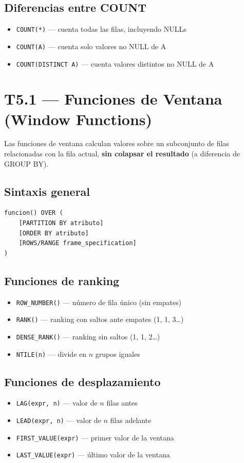 \documentclass[12pt, a4paper]{article}
\begin{document}
\subsection{Diferencias entre COUNT}
\begin{itemize}
  \item \texttt{COUNT(*)} — cuenta todas las filas, incluyendo NULLs
  \item \texttt{COUNT(A)} — cuenta solo valores no NULL de A
  \item \texttt{COUNT(DISTINCT A)} — cuenta valores distintos no NULL de A
\end{itemize}

\section{T5.1 — Funciones de Ventana (Window Functions)}

Las funciones de ventana calculan valores sobre un subconjunto de filas relacionadas con la fila actual, \textbf{sin colapsar el resultado} (a diferencia de GROUP BY).

\subsection{Sintaxis general}
\begin{lstlisting}
funcion() OVER (
    [PARTITION BY atributo]
    [ORDER BY atributo]
    [ROWS/RANGE frame_specification]
)
\end{lstlisting}

\subsection{Funciones de ranking}
\begin{itemize}
  \item \texttt{ROW\_NUMBER()} — número de fila único (sin empates)
  \item \texttt{RANK()} — ranking con saltos ante empates (1, 1, 3\ldots)
  \item \texttt{DENSE\_RANK()} — ranking sin saltos (1, 1, 2\ldots)
  \item \texttt{NTILE(n)} — divide en $n$ grupos iguales
\end{itemize}

\subsection{Funciones de desplazamiento}
\begin{itemize}
  \item \texttt{LAG(expr, n)} — valor de $n$ filas antes
  \item \texttt{LEAD(expr, n)} — valor de $n$ filas adelante
  \item \texttt{FIRST\_VALUE(expr)} — primer valor de la ventana
  \item \texttt{LAST\_VALUE(expr)} — último valor de la ventana
\end{itemize}
\end{document}
